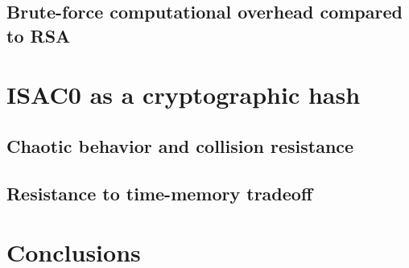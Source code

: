 \documentclass[12pt]{article}
\begin{document}
\subsection{Brute-force computational overhead compared to RSA}

\section{ISAC0 as a cryptographic hash}

\subsection{Chaotic behavior and collision resistance}

\subsection{Resistance to time-memory tradeoff}

\section{Conclusions}
\end{document}
